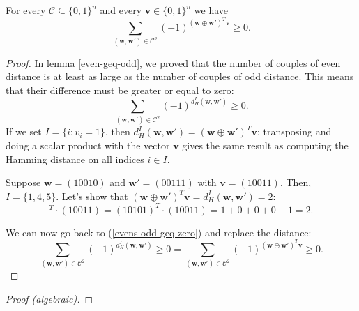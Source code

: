 \begin{lemma}
    For every $\mathcal{C} \subseteq \{0,1\}^n$ and every $\mathbf{v}\in\{0,1\}^n$ we have
    \begin{equation}
        \sum_{(\mathbf{w}, \mathbf{w}')\in\mathcal{C}^2}(-1)^{(\textbf{w} \oplus \textbf{w}')^T\mathbf{v}} \geq 0.
    \end{equation}
    \begin{proof}
        In lemma \ref{even-geq-odd}, we proved that the number of couples of even distance is at least as large as the number of couples of odd distance. This means that their difference must be greater or equal to zero:
        \begin{equation}
            \label{evens-odd-geq-zero}
            \sum_{(\mathbf{w}, \mathbf{w}')\in\mathcal{C}^2}(-1)^{d_H^I(\mathbf{w}, \mathbf{w}')} \geq 0.
        \end{equation}
        If we set $I=\{i:v_i=1\}$, then $d_H^I(\mathbf{w}, \mathbf{w}') = (\textbf{w} \oplus \textbf{w}')^T\mathbf{v}$: transposing and doing a scalar product with the vector $\mathbf{v}$ gives the same result as computing the Hamming distance on all indices $i\in I$.
        \begin{example}
            Suppose $\mathbf{w}=(10010)$ and $\mathbf{w}'=(00111)$ with $\mathbf{v}=(10011)$.
            Then, $I = \{1,4,5\}$. Let's show that $(\textbf{w} \oplus \textbf{w}')^T\mathbf{v} = d_H^I(\mathbf{w}, \mathbf{w}') = 2$:
            \begin{equation*}
                [(10010) \oplus (00111)]^T \cdot (10011) = (10101)^T \cdot (10011) = 1+0+0+0+1 = 2.
            \end{equation*}
        \end{example}
        We can now go back to (\ref{evens-odd-geq-zero}) and replace the distance:
        \begin{equation}
            \sum_{(\mathbf{w}, \mathbf{w}')\in\mathcal{C}^2}(-1)^{d_H^I(\mathbf{w}, \mathbf{w}')} \geq 0
            =
            \sum_{(\mathbf{w}, \mathbf{w}')\in\mathcal{C}^2}(-1)^{(\textbf{w} \oplus \textbf{w}')^T\mathbf{v}} \geq 0.
        \end{equation}
    \end{proof}
    \begin{proof}[Proof (algebraic)]
    \end{proof}
\end{lemma}


